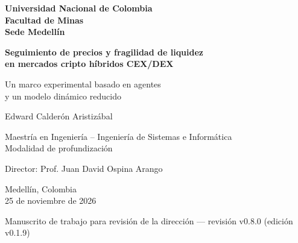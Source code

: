 \documentclass[11pt,letterpaper]{report}
\newcommand{\versionTesis}{v0.1.9}
\newcommand{\revisionManuscrito}{v0.8.0}
\numberwithin{equation}{chapter}
\begin{document}
\begin{titlepage}
  \thispagestyle{empty}
  \centering
  \singlespacing
  {\large\bfseries Universidad Nacional de Colombia\\[2pt]
  Facultad de Minas\\[2pt]
  Sede Medellín\par}
  \vspace{3.2cm}
  {\LARGE\bfseries Seguimiento de precios y fragilidad de liquidez\\
  en mercados cripto híbridos CEX/DEX\par}
  \vspace{0.9cm}
  {\Large Un marco experimental basado en agentes\\
  y un modelo dinámico reducido\par}
  \vspace{2.6cm}
  {\Large Edward Calderón Aristizábal\par}
  \vspace{1.6cm}
  {\large Maestría en Ingeniería -- Ingeniería de Sistemas e Informática\\[2pt]
  Modalidad de profundización\par}
  \vspace{0.8cm}
  {\large Director: Prof. Juan David Ospina Arango\par}
  \vfill
  {\large Medellín, Colombia\\[2pt]
  25 de noviembre de 2026\par}
  \vspace{0.3cm}
  {\small Manuscrito de trabajo para revisión de la dirección --- revisión \revisionManuscrito{} (edición \versionTesis{})\par}
\end{titlepage}

\setcounter{page}{1}

\begingroup
\setcounter{secnumdepth}{-1}
\titleformat{\section}{\Large\bfseries}{}{0pt}{}
\singlespacing

\clearpage

\endgroup
\setcounter{secnumdepth}{2}
\end{document}
